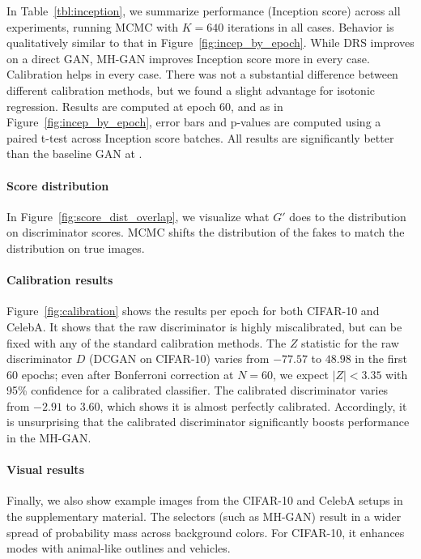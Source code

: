 \documentclass{article}
\begin{document}



In Table~\ref{tbl:inception}, we summarize performance (Inception score) across all experiments, running MCMC with $K=640$ iterations in all cases.
Behavior is qualitatively similar to that in Figure~\ref{fig:incep_by_epoch}.
While DRS improves on a direct GAN, MH-GAN improves Inception score more in every case.
Calibration helps in every case.
There was not a substantial difference between different calibration methods, but we found a slight advantage for isotonic regression.
Results are computed at epoch 60, and as in Figure~\ref{fig:incep_by_epoch}, error bars and p-values are computed using a paired t-test across Inception score batches.
All results are significantly better than the baseline GAN at .

\paragraph{Score distribution}
In Figure~\ref{fig:score_dist_overlap}, we visualize what $G'$ does to the distribution on discriminator scores.
MCMC shifts the distribution of the fakes to match the distribution on true images.

\paragraph{Calibration results}
Figure~\ref{fig:calibration} shows the results per epoch for both CIFAR-10 and CelebA\@.
It shows that the raw discriminator is highly miscalibrated, but can be fixed with any of the standard calibration methods.
The $Z$ statistic for the raw discriminator $D$ (DCGAN on CIFAR-10) varies from $-77.57$ to $48.98$ in the first 60 epochs; even after Bonferroni correction at $N \!\!=\!\! 60$, we expect $|Z| < 3.35$ with 95\% confidence for a calibrated classifier.
The calibrated discriminator varies from $-2.91$ to $3.60$, which shows it is almost perfectly calibrated.
Accordingly, it is unsurprising that the calibrated discriminator significantly boosts performance in the MH-GAN\@.

\paragraph{Visual results}
Finally, we also show example images from the CIFAR-10 and CelebA setups in the supplementary material.
The selectors (such as MH-GAN) result in a wider spread of probability mass across background colors.
For CIFAR-10, it enhances modes with animal-like outlines and vehicles.
\end{document}
